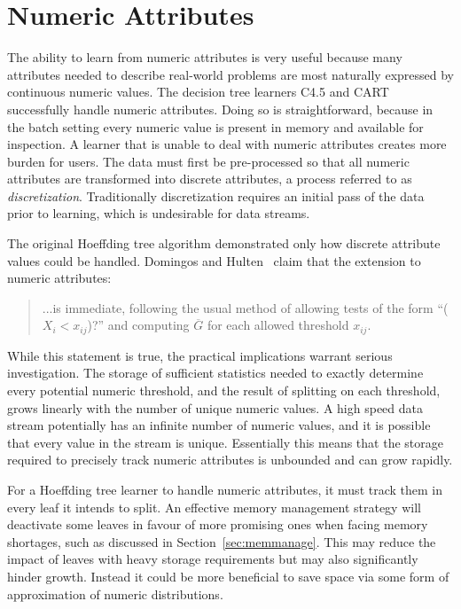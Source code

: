\chapter{Numeric Attributes}
\label{chap:numericatts} 

The ability to learn from numeric attributes is very useful because many attributes needed to describe real-world problems are most naturally expressed by continuous numeric values. The decision tree learners C4.5 and CART successfully handle numeric attributes. Doing so is straightforward, because in the batch setting every numeric value is present in memory and available for inspection. A learner that is unable to deal with numeric attributes creates more burden for users. The data must first be pre-processed so that all numeric attributes are transformed into discrete attributes, a process referred to as {\it discretization}. Traditionally discretization requires an initial pass of the data prior to learning, which is undesirable for data streams.

The original Hoeffding tree algorithm demonstrated only how discrete attribute values could be handled. Domingos and Hulten~\cite{vfdt} claim that the extension to numeric attributes:

\begin{quote}
...is immediate, following the usual method of allowing tests of the form ``($X_i < x_{ij}$)?'' and computing $\overline{G}$ for each allowed threshold $x_{ij}$.
\end{quote}

While this statement is true, the practical implications warrant serious investigation. The storage of sufficient statistics needed to exactly determine every potential numeric threshold, and the result of splitting on each threshold, grows linearly with the number of unique numeric values. A high speed data stream potentially has an infinite number of numeric values, and it is possible that every value in the stream is unique. Essentially this means that the storage required to precisely track numeric attributes is unbounded and can grow rapidly.

For a Hoeffding tree learner to handle numeric attributes, it must track them in every leaf it intends to split.
An effective memory management strategy will deactivate some leaves in favour of more promising ones when facing memory shortages, such as discussed in Section~\ref{sec:memmanage}. This may reduce the impact of leaves with heavy storage requirements but may also significantly hinder growth. Instead it could be more beneficial to save space via some form of approximation of numeric distributions.

